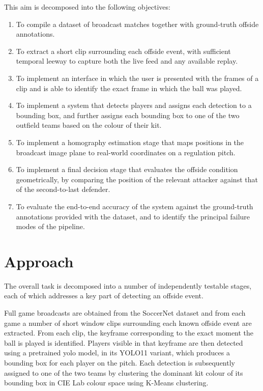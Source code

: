 This aim is decomposed into the following objectives:

\begin{enumerate}
    \item To compile a dataset of broadcast matches together with ground-truth offside annotations.
    \item To extract a short clip surrounding each offside event, with sufficient temporal leeway to capture both the live feed and any available replay.
    \item To implement an interface in which the user is presented with the frames of a clip and is able to identify the exact frame in which the ball was played.
    \item To implement a system that detects players and assigns each detection to a bounding box, and further assigns each bounding box to one of the two outfield teams based on the colour of their kit.
    \item To implement a homography estimation stage that maps positions in the broadcast image plane to real-world coordinates on a regulation pitch.
    \item To implement a final decision stage that evaluates the offside condition geometrically, by comparing the position of the relevant attacker against that of the second-to-last defender.
    \item To evaluate the end-to-end accuracy of the system against the ground-truth annotations provided with the dataset, and to identify the principal failure modes of the pipeline.
\end{enumerate}

\section{Approach}%
\label{sec:intro_approach}

The overall task is decomposed into a number of independently testable stages, each of which addresses a key part of detecting an offside event.

Full game broadcasts are obtained from the SoccerNet dataset and from each game a number of short window clips surrounding each known offside event are extracted. From each clip, the keyframe corresponding to the exact moment the ball is played is identified. Players visible in that keyframe are then detected using a pretrained \gls{yolo} model, in its YOLO11 variant, which produces a bounding box for each player on the pitch. Each detection is subsequently assigned to one of the two teams by clustering the dominant kit colour of its bounding box in CIE Lab colour space using K-Means clustering.

